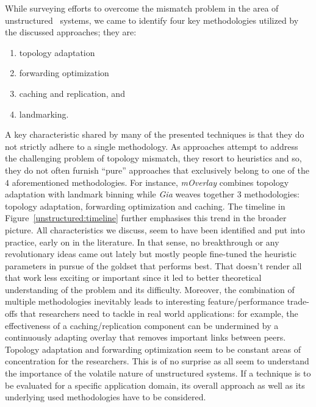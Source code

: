 While surveying efforts to overcome the mismatch problem
in the area of unstructured \p\ systems,
we came to identify four key methodologies 
utilized by the discussed approaches; they are:
\begin{enumerate}
  \item topology adaptation
  \item forwarding optimization
  \item caching and replication, and
  \item landmarking.
\end{enumerate}
%
A key characteristic shared by many of the presented techniques 
is that they do not strictly adhere to a single methodology.
As approaches attempt to address the challenging problem 
of topology mismatch, they resort to heuristics and so, 
they do not often furnish ``pure'' approaches that exclusively
belong to one of the $4$ aforementioned methodologies.
For instance, \emph{mOverlay} combines topology adaptation 
with landmark binning 
while \emph{Gia} weaves together $3$ methodologies:  topology adaptation, 
forwarding optimization and caching.
The timeline in Figure~\ref{unstructured:timeline} further emphasises this trend
in the broader picture. All characteristics we discuss,
seem to have been identified and put into practice, early on in the literature.
In that sense, no breakthrough
or any revolutionary ideas came out lately but mostly people fine-tuned the
heuristic parameters in pursue of the goldset that performs best. That doesn't
render all that work less exciting or important since it led to better theoretical
understanding of the problem and its difficulty. Moreover, the combination of
multiple methodologies inevitably leads to interesting feature/performance trade-offs
that researchers need to tackle in real world applications: for example, 
the effectiveness of a caching/replication component can be undermined
by a continuously adapting overlay that removes important links between peers.
Topology adaptation and forwarding optimization seem to be constant areas of
concentration for the researchers. This is of no surprise as all seem to
understand the importance of the volatile nature of unstructured \p systems. 
If a technique is to be evaluated for a specific application domain,
its overall approach as well as its underlying used methodologies have to be considered.


